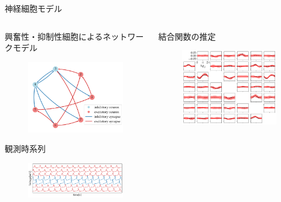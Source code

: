 \begin{frame}{神経細胞モデル}
  \begin{columns}[t]
    \begin{column}{0.5\textwidth}
      \checkmark 興奮性・抑制性細胞によるネットワークモデル
      \begin{figure}
        \includegraphics[width=0.9\columnwidth]{figs/snn_netplot.pdf}
      \end{figure}
      \checkmark 観測時系列
      \begin{figure}
        \includegraphics[width=0.9\columnwidth]{figs/snn_volt.pdf}
      \end{figure}
    \end{column}
    \begin{column}{0.5\textwidth}
      \checkmark 結合関数の推定
      \begin{figure}
        \includegraphics[width=\columnwidth]{figs/snn_gp_100.pdf}

\end{figure}
\end{column}
\end{columns}
\end{frame}
